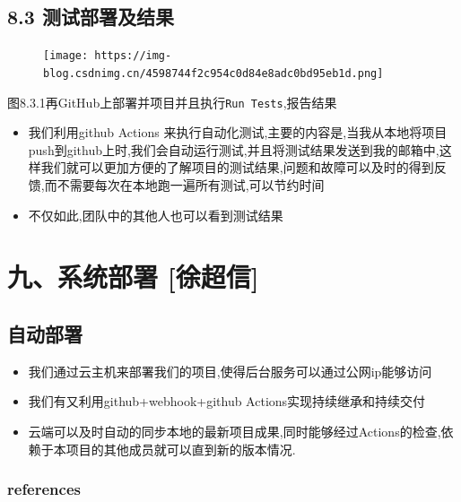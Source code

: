 \documentclass[
]{article}
\begin{document}
\hypertarget{83-ux6d4bux8bd5ux90e8ux7f72ux53caux7ed3ux679c}{%
\subsection{8.3
测试部署及结果}\label{83-ux6d4bux8bd5ux90e8ux7f72ux53caux7ed3ux679c}}

\begin{figure}
\centering
\texttt{[image: https://img-blog.csdnimg.cn/4598744f2c954c0d84e8adc0bd95eb1d.png]}
\caption{}
\end{figure}

图8.3.1再GitHub上部署并项目并且执行\texttt{Run\ Tests},报告结果

\begin{itemize}
\item
  我们利用github Actions
  来执行自动化测试,主要的内容是,当我从本地将项目push到github上时,我们会自动运行测试,并且将测试结果发送到我的邮箱中,这样我们就可以更加方便的了解项目的测试结果,问题和故障可以及时的得到反馈,而不需要每次在本地跑一遍所有测试,可以节约时间
\item
  不仅如此,团队中的其他人也可以看到测试结果
\end{itemize}

\hypertarget{ux4e5dux7cfbux7edfux90e8ux7f72-ux5f90ux8d85ux4fe1}{%
\section{九、系统部署
{[}徐超信{]}}\label{ux4e5dux7cfbux7edfux90e8ux7f72-ux5f90ux8d85ux4fe1}}

\hypertarget{ux81eaux52a8ux90e8ux7f72}{%
\subsection{自动部署}\label{ux81eaux52a8ux90e8ux7f72}}

\begin{itemize}
\item
  我们通过云主机来部署我们的项目,使得后台服务可以通过公网ip能够访问
\item
  我们有又利用github+webhook+github Actions实现持续继承和持续交付
\item
  云端可以及时自动的同步本地的最新项目成果,同时能够经过Actions的检查,依赖于本项目的其他成员就可以直到新的版本情况.
\end{itemize}

\hypertarget{references}{%
\subsubsection{references}\label{references}}
\end{document}
